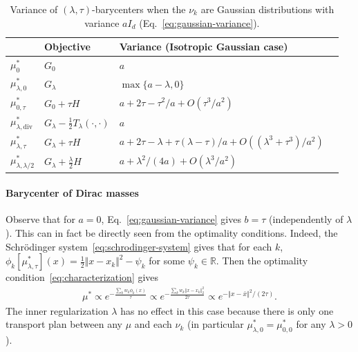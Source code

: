 \documentclass[11pt]{article}
\newcommand{\RR}{\mathbb{R}}
\begin{document}
\begin{table}
\centering
\begin{tabular}{l|l|l|c}
& Objective  & Variance (Isotropic Gaussian case) \\
\hline
$\mu_{0}^*$  &  $G_0$ &  $a$ \\
$\mu_{\lambda,0}^*$  &   $G_\lambda$ &  $\max\{a - \lambda, 0 \}$ \\
$\mu_{0,\tau}^*$ &  $G_0 +\tau H$ &   $a+2\tau-\tau^2/a+O(\tau^3/a^2)$\\
$\mu_{\lambda,\mathrm{div}}^*$ &  $G_\lambda -\frac12 T_\lambda(\cdot,\cdot)$  &   $a$\\
$\mu_{\lambda,\tau}^*$ &  $G_\lambda +\tau H$ &   $a+2\tau-\lambda+\tau(\lambda-\tau)/a +O((\lambda^3+\tau^3)/a^2)$\\
$\mu_{\lambda,\lambda/2}^*$ &  $G_\lambda +\frac{\lambda}{2} H$ &   $a+\lambda^2/(4a) +O(\lambda^3/a^2)$\\
 \hline

\end{tabular}
\caption{Variance of $(\lambda,\tau)$-barycenters when the $\nu_k$ are  Gaussian distributions with variance $aI_d$ (Eq.~\eqref{eq:gaussian-variance}).
}\label{tab:gaussian}
\end{table}

\paragraph{Barycenter of Dirac masses} Observe that for $a=0$, Eq.~\eqref{eq:gaussian-variance} gives $b=\tau$ (independently of $\lambda$). This can in fact be directly seen from the optimality conditions. Indeed, the Schr\"odinger system~\eqref{eq:schrodinger-system} gives that for each $k$,
$
\phi_{k}[{\mu^*_{\lambda,\tau}}](x) = \frac12 \Vert x-x_k\Vert^2 -\psi_k
$
 for some $\psi_k\in \RR$. Then the optimality condition~\eqref{eq:characterization} gives
 \begin{align*}
 \mu^*\propto e^{-\frac{\sum_k w_k \phi_{k}(x)}{\tau}} \propto e^{-\frac{\sum_k w_k \Vert x-x_k\Vert^2_2}{2\tau}}\propto e^{-\Vert x- \bar x\Vert^2/(2\tau)}.
 \end{align*}
The inner regularization $\lambda$ has no effect in this case because there is only one transport plan between any $\mu$ and each $\nu_k$ (in particular $\mu_{\lambda,0}^*=\mu^*_{0,0}$ for any $\lambda>0$).

  
\end{document}
